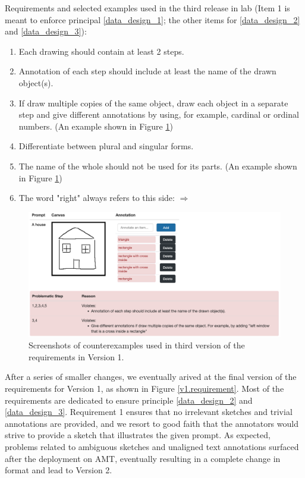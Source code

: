 Requirements and selected examples used in the third release in lab (Item 1 is meant to enforce principal \ref{data_design_1}; the other items for \ref{data_design_2} and \ref{data_design_3}):
\begin{enumerate}
\item Each drawing should contain at least 2 steps.
\item Annotation of each step should include at least the name of the drawn object(s).
\item If draw multiple copies of the same object, draw each object in a separate step and give different annotations by using, for example, cardinal or ordinal numbers. (An example shown in Figure \ref{v1.requirement_3})
\item Differentiate between plural and singular forms.
\item The name of the whole should not be used for its parts. (An example shown in Figure \ref{v1.requirement_3})
\item The word "right" always refers to this side: $\Longrightarrow$
\end{enumerate}

\begin{figure}[!htb]
\includegraphics[width=.8\linewidth]{data_collection/v1_requirement3_bad1.png}  
\caption{Screenshots of counterexamples used in third version of the requirements in Version 1.}
\label{v1.requirement_3}
\end{figure}

After a series of smaller changes, we eventually arived at the final version of the requirements for Version 1, as shown in Figure \ref{v1.requirement}. Most of the requirements are dedicated to ensure principle \ref{data_design_2} and \ref{data_design_3}. Requirement 1 ensures that no irrelevant sketches and trivial annotations are provided, and we resort to good faith that the annotators would strive to provide a sketch that illustrates the given prompt. As expected, problems related to ambiguous sketches and unaligned text annotations surfaced after the deployment on AMT, eventually resulting in a complete change in format and lead to Version 2.     

